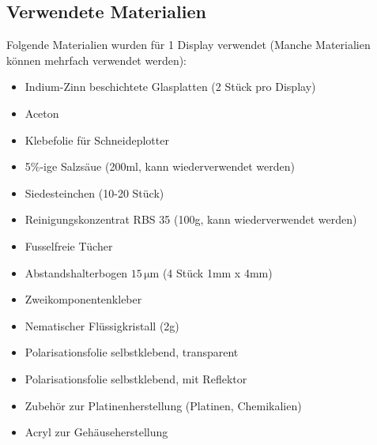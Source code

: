 
\subsection{Verwendete Materialien}

Folgende Materialien wurden für 1 Display verwendet (Manche Materialien können mehrfach verwendet werden):\\

\begin{itemize}
\item Indium-Zinn beschichtete Glasplatten (2 Stück pro Display)
\item Aceton
\item Klebefolie für Schneideplotter
\item 5\%-ige Salzsäue (200ml, kann wiederverwendet werden)
\item Siedesteinchen (10-20 Stück)
\item Reinigungskonzentrat RBS 35 (100g, kann wiederverwendet werden)
\item Fusselfreie Tücher
\item Abstandshalterbogen \(15\,\mathrm{\mu m}\) (4 Stück 1mm x 4mm)
\item Zweikomponentenkleber
\item Nematischer Flüssigkristall (2g)
\item Polarisationsfolie selbstklebend, transparent
\item Polarisationsfolie selbstklebend, mit Reflektor
\item Zubehör zur Platinenherstellung (Platinen, Chemikalien)
\item Acryl zur Gehäuseherstellung
\end{itemize}